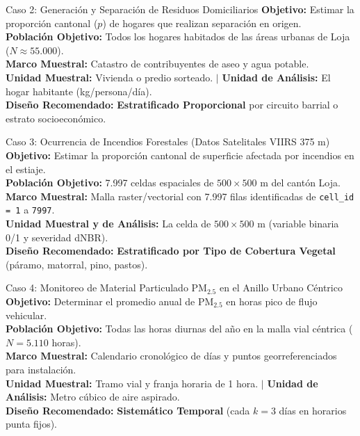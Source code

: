\documentclass[11pt,a4paper]{article}
\begin{document}
\begin{casobox}{Caso 2: Generación y Separación de Residuos Domiciliarios}
\textbf{Objetivo:} Estimar la proporción cantonal ($p$) de hogares que realizan separación en origen.\\
\textbf{Población Objetivo:} Todos los hogares habitados de las áreas urbanas de Loja ($N \approx 55.000$).\\
\textbf{Marco Muestral:} Catastro de contribuyentes de aseo y agua potable.\\
\textbf{Unidad Muestral:} Vivienda o predio sorteado. $\vert$ \textbf{Unidad de Análisis:} El hogar habitante (kg/persona/día).\\
\textbf{Diseño Recomendado:} \textbf{Estratificado Proporcional} por circuito barrial o estrato socioeconómico.
\end{casobox}

\begin{casobox}{Caso 3: Ocurrencia de Incendios Forestales (Datos Satelitales VIIRS 375 m)}
\textbf{Objetivo:} Estimar la proporción cantonal de superficie afectada por incendios en el estiaje.\\
\textbf{Población Objetivo:} 7.997 celdas espaciales de $500 \times 500$ m del cantón Loja.\\
\textbf{Marco Muestral:} Malla raster/vectorial con 7.997 filas identificadas de \texttt{cell\_id = 1} a \texttt{7997}.\\
\textbf{Unidad Muestral y de Análisis:} La celda de $500 \times 500$ m (variable binaria 0/1 y severidad dNBR).\\
\textbf{Diseño Recomendado:} \textbf{Estratificado por Tipo de Cobertura Vegetal} (páramo, matorral, pino, pastos).
\end{casobox}

\begin{casobox}{Caso 4: Monitoreo de Material Particulado PM$_{2.5}$ en el Anillo Urbano Céntrico}
\textbf{Objetivo:} Determinar el promedio anual de PM$_{2.5}$ en horas pico de flujo vehicular.\\
\textbf{Población Objetivo:} Todas las horas diurnas del año en la malla vial céntrica ($N = 5.110$ horas).\\
\textbf{Marco Muestral:} Calendario cronológico de días y puntos georreferenciados para instalación.\\
\textbf{Unidad Muestral:} Tramo vial y franja horaria de 1 hora. $\vert$ \textbf{Unidad de Análisis:} Metro cúbico de aire aspirado.\\
\textbf{Diseño Recomendado:} \textbf{Sistemático Temporal} (cada $k = 3$ días en horarios punta fijos).
\end{casobox}
\end{document}

